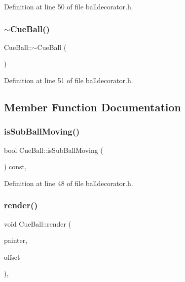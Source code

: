 Definition at line 50 of file balldecorator.\+h.

\mbox{\label{class_cue_ball_a4cd3c714cdfc9f5dd9aeaa325f01bb18}} 
\subsubsection{\texorpdfstring{$\sim$\+Cue\+Ball()}{~CueBall()}}
{\footnotesize\ttfamily Cue\+Ball\+::$\sim$\+Cue\+Ball (\begin{DoxyParamCaption}{ }\end{DoxyParamCaption})\hspace{0.3cm}{\ttfamily [inline]}}



Definition at line 51 of file balldecorator.\+h.



\subsection{Member Function Documentation}
\mbox{\label{class_cue_ball_a7035345f6ba5c29052a5a1444e3f076f}} 
\subsubsection{\texorpdfstring{is\+Sub\+Ball\+Moving()}{isSubBallMoving()}}
{\footnotesize\ttfamily bool Cue\+Ball\+::is\+Sub\+Ball\+Moving (\begin{DoxyParamCaption}{ }\end{DoxyParamCaption}) const\hspace{0.3cm}{\ttfamily [inline]}, {\ttfamily [protected]}}



Definition at line 48 of file balldecorator.\+h.

\mbox{\label{class_cue_ball_a915a83205e4cfc720fbd884b045e2f81}} 
\subsubsection{\texorpdfstring{render()}{render()}}
{\footnotesize\ttfamily void Cue\+Ball\+::render (\begin{DoxyParamCaption}\item[{Q\+Painter \&}]{painter,  }\item[{const Q\+Vector2D \&}]{offset }\end{DoxyParamCaption})\hspace{0.3cm}{\ttfamily [override]}, {\ttfamily [virtual]}}



